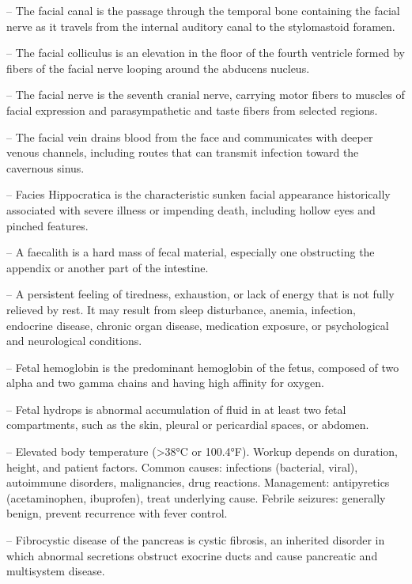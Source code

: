 -- The facial canal is the passage through the temporal bone containing the facial nerve as it travels from the internal auditory canal to the stylomastoid foramen.

-- The facial colliculus is an elevation in the floor of the fourth ventricle formed by fibers of the facial nerve looping around the abducens nucleus.

-- The facial nerve is the seventh cranial nerve, carrying motor fibers to muscles of facial expression and parasympathetic and taste fibers from selected regions.

-- The facial vein drains blood from the face and communicates with deeper venous channels, including routes that can transmit infection toward the cavernous sinus.

-- Facies Hippocratica is the characteristic sunken facial appearance historically associated with severe illness or impending death, including hollow eyes and pinched features.

-- A faecalith is a hard mass of fecal material, especially one obstructing the appendix or another part of the intestine.

-- A persistent feeling of tiredness, exhaustion, or lack of energy that is not fully relieved by rest. It may result from sleep disturbance, anemia, infection, endocrine disease, chronic organ disease, medication exposure, or psychological and neurological conditions.

-- Fetal hemoglobin is the predominant hemoglobin of the fetus, composed of two alpha and two gamma chains and having high affinity for oxygen.

-- Fetal hydrops is abnormal accumulation of fluid in at least two fetal compartments, such as the skin, pleural or pericardial spaces, or abdomen.

-- Elevated body temperature (>38°C or 100.4°F). Workup depends on duration, height, and patient factors. Common causes: infections (bacterial, viral), autoimmune disorders, malignancies, drug reactions. Management: antipyretics (acetaminophen, ibuprofen), treat underlying cause. Febrile seizures: generally benign, prevent recurrence with fever control.

-- Fibrocystic disease of the pancreas is cystic fibrosis, an inherited disorder in which abnormal secretions obstruct exocrine ducts and cause pancreatic and multisystem disease.

